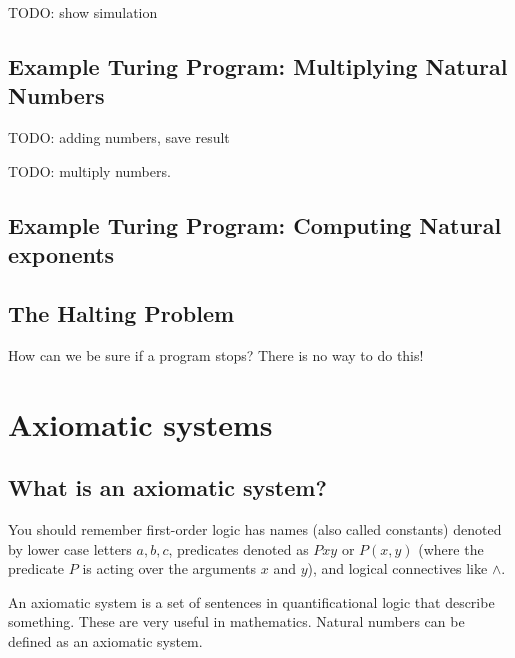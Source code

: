 \documentclass[11pt, letterpaper, twoside, openright]{book}
\begin{document}
TODO: show simulation

\subsection{Example Turing Program: Multiplying Natural Numbers}
TODO: adding numbers, save result

TODO: multiply numbers.

\subsection{Example Turing Program: Computing Natural exponents}

\subsection{The Halting Problem}
How can we be sure if a program stops? There is no way to do this!

\section{Axiomatic systems}
\subsection{What is an axiomatic system?}

You should remember first-order logic has names (also called constants) denoted by lower case letters $a, b, c$, predicates denoted as $Pxy$ or $P(x,y)$ (where the predicate $P$ is acting over the arguments $x$ and $y$), and logical connectives like $\wedge$.

An axiomatic system is a set of sentences in quantificational logic that describe something. These are very useful in mathematics. Natural numbers can be defined as an axiomatic system.
\end{document}
